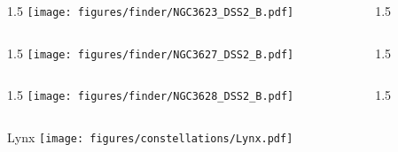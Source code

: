 \documentclass[final]{beamer}
\newlength{\colwidth}
\begin{document}

\begin{frame}[t]{}
    \begin{columns}[T]
        \begin{column}{1.5\colwidth}
            \centering
            \texttt{[image: figures/finder/NGC3623\_DSS2\_B.pdf]}
        \end{column}
        \begin{column}{1.5\colwidth}
            \Large
            
        \end{column}
    \end{columns}
    \vspace{\fill}
    \begin{columns}[T]
        \begin{column}{1.5\colwidth}
            \centering
            \texttt{[image: figures/finder/NGC3627\_DSS2\_B.pdf]}
        \end{column}
        \begin{column}{1.5\colwidth}
            \Large
            
        \end{column}
    \end{columns}
\end{frame}


\begin{frame}[t]{}
    \begin{columns}[T]
        \begin{column}{1.5\colwidth}
            \centering
            \texttt{[image: figures/finder/NGC3628\_DSS2\_B.pdf]}
        \end{column}
        \begin{column}{1.5\colwidth}
            \Large
            
        \end{column}
    \end{columns}
    \vspace{\fill}
\end{frame}


\begin{frame}[t]{\LARGE Lynx}
    \centering
    \texttt{[image: figures/constellations/Lynx.pdf]}
\end{frame}
\end{document}
